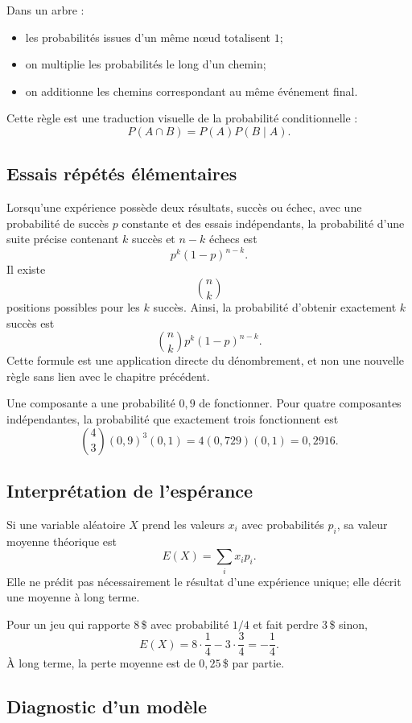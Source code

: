 \documentclass[12pt,a4paper,openany]{book}
\begin{document}
Dans un arbre :
\begin{itemize}
\item les probabilités issues d'un même nœud totalisent $1$;
\item on multiplie les probabilités le long d'un chemin;
\item on additionne les chemins correspondant au même événement final.
\end{itemize}

Cette règle est une traduction visuelle de la probabilité conditionnelle :
\[
P(A\cap B)=P(A)P(B\mid A).
\]

\subsection{Essais répétés élémentaires}

Lorsqu'une expérience possède deux résultats, succès ou échec, avec une probabilité de succès $p$ constante et des essais indépendants, la probabilité d'une suite précise contenant $k$ succès et $n-k$ échecs est
\[
p^k(1-p)^{n-k}.
\]
Il existe
\[
\binom nk
\]
positions possibles pour les $k$ succès. Ainsi, la probabilité d'obtenir exactement $k$ succès est
\[
\binom nkp^k(1-p)^{n-k}.
\]
Cette formule est une application directe du dénombrement, et non une nouvelle règle sans lien avec le chapitre précédent.

\begin{examplebox}
Une composante a une probabilité $0{,}9$ de fonctionner. Pour quatre composantes indépendantes, la probabilité que exactement trois fonctionnent est
\[
\binom43(0{,}9)^3(0{,}1)=4(0{,}729)(0{,}1)=0{,}2916.
\]
\end{examplebox}

\subsection{Interprétation de l'espérance}

Si une variable aléatoire $X$ prend les valeurs $x_i$ avec probabilités $p_i$, sa valeur moyenne théorique est
\[
E(X)=\sum_i x_ip_i.
\]
Elle ne prédit pas nécessairement le résultat d'une expérience unique; elle décrit une moyenne à long terme.

Pour un jeu qui rapporte $8\,$\$ avec probabilité $1/4$ et fait perdre $3\,$\$ sinon,
\[
E(X)=8\cdot\frac14-3\cdot\frac34=-\frac14.
\]
À long terme, la perte moyenne est de $0{,}25\,$\$ par partie.

\subsection{Diagnostic d'un modèle}
\end{document}
